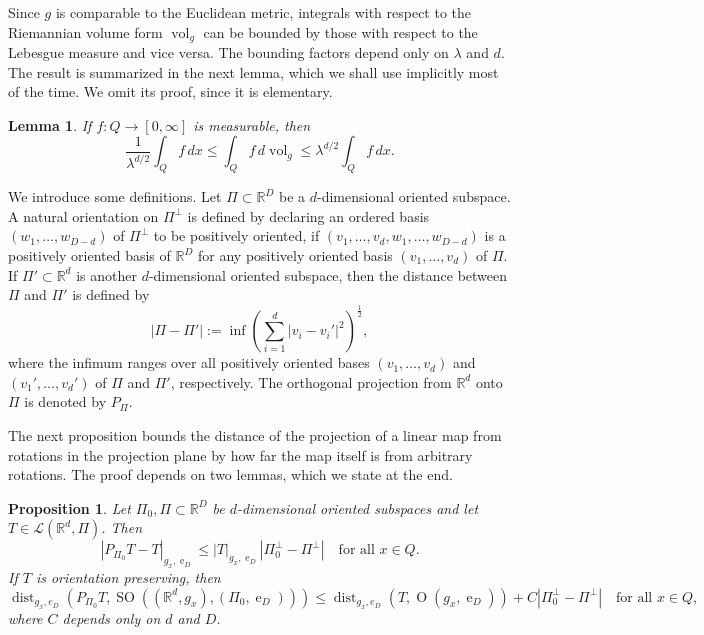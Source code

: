 \documentclass{article}
\numberwithin{equation}{section}
\newtheorem{lemma}[theorem]{Lemma}
\newtheorem{proposition}[theorem]{Proposition}
\theoremstyle{definition}
\theoremstyle{remark}
\DeclareMathOperator{\dist}{dist}
\DeclareMathOperator{\e}{e}
\DeclareMathOperator{\Ort}{O}
\DeclareMathOperator{\SO}{SO}
\DeclareMathOperator{\vol}{vol}
\begin{document}
Since $g$ is comparable to the Euclidean metric, integrals with respect to the Riemannian volume form $\vol_g$ can be bounded by those with respect to the Lebesgue measure and vice versa. The bounding factors depend only on $\lambda$ and $d$. The result is summarized in the next lemma, which we shall use implicitly most of the time. We omit its proof, since it is elementary.

\begin{lemma} \label{lm:change_in_volume}
    If $f : Q \rightarrow [0, \infty]$ is measurable, then
    \[
    \frac{1}{\lambda^{d/2}} \int_Q f \, dx \le \int_Q f \, d\vol_g \le \lambda^{d/2} \int_Q f \, dx.
    \]
\end{lemma}

We introduce some definitions. Let $\Pi \subset \mathbb{R}^D$ be a $d$-dimensional oriented subspace. A natural orientation on $\Pi^\perp$ is defined by declaring an ordered basis $(w_1, \dots, w_{D - d})$ of $\Pi^\perp$ to be positively oriented, if $(v_1, \dots, v_d, w_1, \dots, w_{D - d})$ is a positively oriented basis of $\mathbb{R}^D$ for any positively oriented basis $(v_1, \dots, v_d)$ of $\Pi$. If $\Pi' \subset \mathbb{R}^d$ is another $d$-dimensional oriented subspace, then the distance between $\Pi$ and $\Pi'$ is defined by
\[
|\Pi - \Pi'| := \inf \left(\sum_{i = 1}^d |v_i - v_i'|^2\right)^\frac{1}{2},
\]
where the infimum ranges over all positively oriented bases $(v_1, \dots, v_d)$ and $(v_1', \dots, v_d')$ of $\Pi$ and $\Pi'$, respectively. 
The orthogonal projection from $\mathbb{R}^d$ onto $\Pi$ is denoted by $P_\Pi$.

The next proposition bounds the distance of the projection of a linear map from rotations in the projection plane by how far the map itself is from arbitrary rotations. The proof depends on two lemmas, which we state at the end.

\begin{proposition}
    Let $\Pi_0, \Pi \subset \mathbb{R}^D$ be $d$-dimensional oriented subspaces and let $T \in \mathcal{L}(\mathbb{R}^d, \Pi)$. Then
    \begin{equation} \label{eq:error_in_projection}
        |P_{\Pi_0}T - T|_{g_x, \e_D} \le |T|_{g_x, \e_D}|\Pi_0^\perp - \Pi^\perp| \quad \text{for all } x \in Q.
    \end{equation}
    If $T$ is orientation preserving, then
    \begin{equation} \label{eq:bound_for_distance_from_oriented_rotations}
        \dist_{g_x, e_D}\left(P_{\Pi_0} T, \SO\left((\mathbb{R}^d, g_x), (\Pi_0, \e_D)\right)\right) \le \dist_{g_x, e_D}(T, \Ort(g_x, \e_D)) + C|\Pi_0^\perp - \Pi^\perp| \quad \text{for all } x \in Q,
    \end{equation}
    where $C$ depends only on $d$ and $D$.
\end{proposition}
\end{document}
